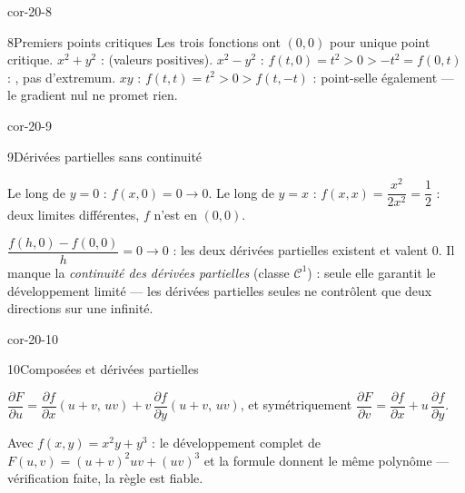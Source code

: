\begin{blocLivre}{cor-20-8}
\begin{corrige}{8}{Premiers points critiques}
Les trois fonctions ont $(0,0)$ pour unique point critique.
$x^{2}+y^{2}$ :  (valeurs positives).
$x^{2}-y^{2}$ : $f(t,0)=t^{2}>0>-t^{2}=f(0,t)$ :
, pas d'extremum. $xy$ : $f(t,t)=t^{2}>0>
f(t,-t)$ : point-selle également — le gradient nul ne promet rien.
\end{corrige}
\end{blocLivre}

\begin{blocLivre}{cor-20-9}
\begin{corrige}{9}{Dérivées partielles sans continuité}
\begin{questions}
  \item Le long de $y=0$ : $f(x,0)=0\to0$. Le long de $y=x$ :
    $f(x,x)=\dfrac{x^{2}}{2x^{2}}=\dfrac12$ : deux limites différentes,
    $f$ n'est  en $(0,0)$.
  \item $\dfrac{f(h,0)-f(0,0)}{h}=0\to0$ : les deux dérivées partielles
    existent et valent $0$. Il manque la \emph{continuité des dérivées
    partielles} (classe $\mathcal{C}^{1}$) : seule elle garantit le
    développement limité — les dérivées partielles seules ne contrôlent
    que deux directions sur une infinité.
\end{questions}
\end{corrige}
\end{blocLivre}

\begin{blocLivre}{cor-20-10}
\begin{corrige}{10}{Composées et dérivées partielles}
\begin{questions}
  \item $\dfrac{\partial F}{\partial u}
    =\dfrac{\partial f}{\partial x}(u+v,\,uv)
    +v\,\dfrac{\partial f}{\partial y}(u+v,\,uv)$, et symétriquement
    $\dfrac{\partial F}{\partial v}
    =\dfrac{\partial f}{\partial x}+u\,\dfrac{\partial f}{\partial y}$.
  \item Avec $f(x,y)=x^{2}y+y^{3}$ : le développement complet de
    $F(u,v)=(u+v)^{2}uv+(uv)^{3}$ et la formule donnent le même
    polynôme — vérification faite, la règle est fiable.
\end{questions}
\end{corrige}
\end{blocLivre}

